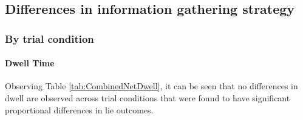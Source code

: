 \documentclass[man, floatsintext]{apa7}
\begin{document}
\subsection{Differences in information gathering strategy}

\subsubsection{By trial condition}

\paragraph{Dwell Time}
Observing Table \ref{tab:CombinedNetDwell}, it can be seen that no differences in dwell are observed across trial conditions that were found to have significant proportional differences in lie outcomes.
\end{document}
